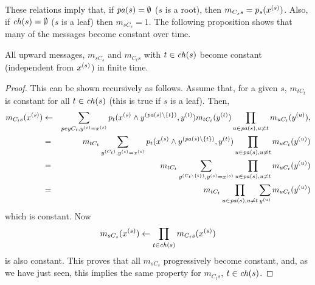 These relations imply that, if ${\mathit{pa}(s)}=\emptyset$ ($s$ is a root), then
$m_{C_ss} = p_s(x^{(s)})$. Also, if ${\mathit{ch}(s)} = \emptyset$ ($s$ is a leaf) then
$m_{sC_s} = 1$. The following proposition shows that many of the
messages become constant over time.
\begin{proposition}
\label{prop:bp.bay.1}
All upward messages, $m_{sC_s}$ and $m_{C_ts}$ with $t\in {\mathit{ch}(s)}$ become
constant (independent from $x^{(s)}$) in finite time.
\end{proposition}
\begin{proof}
This can be shown recursively as follows. Assume that, for a given
$s$,  $m_{tC_t}$ is
constant for all $t\in {\mathit{ch}(s)}$ (this is true if $s$ is a leaf). Then,
\begin{eqnarray*}
m_{C_ts}(x^{(s)}) &\leftarrow& \sum_{pe y{C_t}, y^{(s)} = x^{(s)}} 
p_t(x^{(s)}\wedge y^{({\mathit{pa}(s)}\setminus\{t\})}, y^{(t)}) m_{tC_t}(y^{(t)}) \prod_{u\in
{\mathit{pa}(s)}, u\neq t} m_{uC_t}(y^{(u)}), \\
&=& m_{tC_t} \sum_{y^{(C_t)}, y^{(s)} = x^{(s)}} p_t(x^{(s)}\wedge y^{({\mathit{pa}(s)}\setminus\{t\})}, y^{(t)}) \prod_{u\in
{\mathit{pa}(s)}, u\neq t} m_{uC_t}(y^{(u)})\\
&=& m_{tC_t} \sum_{y^{(C_t\setminus \{t\})}, y^{(s)} = x^{(s)}} \prod_{u\in
{\mathit{pa}(s)}, u\neq t} m_{uC_t}(y^{(u)})\\
&=& m_{tC_t} \prod_{u\in {\mathit{pa}(s)}, u\neq t} \sum_{y^{(u)}} m_{uC_t}(y^{(u)})
\end{eqnarray*}
which is constant. Now
$$
m_{sC_s}(x^{(s)}) \leftarrow \prod_{t\in {\mathit{ch}(s)}} m_{C_ts}(x^{(s)})
$$
is also constant. This proves that all $m_{sC_s}$ progressively become
constant, and, as we have just seen, this implies the same property
for $m_{C_ts}$, $t\in {\mathit{ch}(s)}$.
\end{proof}

